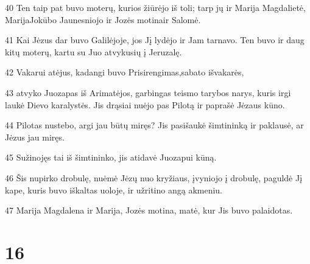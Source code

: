 \par 40 Ten taip pat buvo moterų, kurios žiūrėjo iš toli; tarp jų ir Marija Magdalietė, Marija­Jokūbo Jaunesniojo ir Jozės motina­ir Salomė. 
\par 41 Kai Jėzus dar buvo Galilėjoje, jos Jį lydėjo ir Jam tarnavo. Ten buvo ir daug kitų moterų, kartu su Juo atvykusių į Jeruzalę. 
\par 42 Vakarui atėjus, kadangi buvo Prisirengimas,­sabato išvakarės,­ 
\par 43 atvyko Juozapas iš Arimatėjos, garbingas teismo tarybos narys, kuris irgi laukė Dievo karalystės. Jis drąsiai nuėjo pas Pilotą ir paprašė Jėzaus kūno. 
\par 44 Pilotas nustebo, argi jau būtų miręs? Jis pasišaukė šimtininką ir paklausė, ar Jėzus jau miręs. 
\par 45 Sužinojęs tai iš šimtininko, jis atidavė Juozapui kūną. 
\par 46 Šis nupirko drobulę, nuėmė Jėzų nuo kryžiaus, įvyniojo į drobulę, paguldė Jį kape, kuris buvo iškaltas uoloje, ir užritino angą akmeniu. 
\par 47 Marija Magdalena ir Marija, Jozės motina, matė, kur Jis buvo palaidotas.



\chapter{16}


